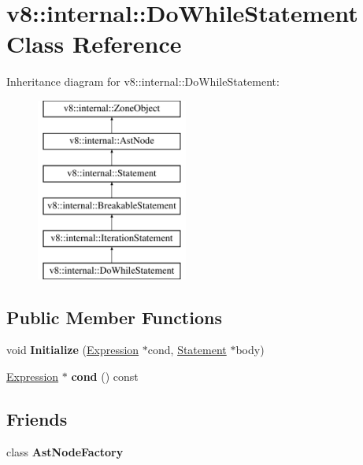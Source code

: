\hypertarget{classv8_1_1internal_1_1DoWhileStatement}{}\section{v8\+:\+:internal\+:\+:Do\+While\+Statement Class Reference}
\label{classv8_1_1internal_1_1DoWhileStatement}
Inheritance diagram for v8\+:\+:internal\+:\+:Do\+While\+Statement\+:\begin{figure}[H]
\begin{center}
\leavevmode
\includegraphics[height=6.000000cm]{classv8_1_1internal_1_1DoWhileStatement}
\end{center}
\end{figure}
\subsection*{Public Member Functions}
\begin{DoxyCompactItemize}
\item 
\mbox{\label{classv8_1_1internal_1_1DoWhileStatement_a2e4030933fc34777c59bdbc625d87431}} 
void {\bfseries Initialize} (\mbox{\hyperlink{classv8_1_1internal_1_1Expression}{Expression}} $\ast$cond, \mbox{\hyperlink{classv8_1_1internal_1_1Statement}{Statement}} $\ast$body)
\item 
\mbox{\label{classv8_1_1internal_1_1DoWhileStatement_aabb8151687ceb1053fba63230ab404c4}} 
\mbox{\hyperlink{classv8_1_1internal_1_1Expression}{Expression}} $\ast$ {\bfseries cond} () const
\end{DoxyCompactItemize}
\subsection*{Friends}
\begin{DoxyCompactItemize}
\item 
\mbox{\label{classv8_1_1internal_1_1DoWhileStatement_a8d587c8ad3515ff6433eb83c578e795f}} 
class {\bfseries Ast\+Node\+Factory}
\end{DoxyCompactItemize}
